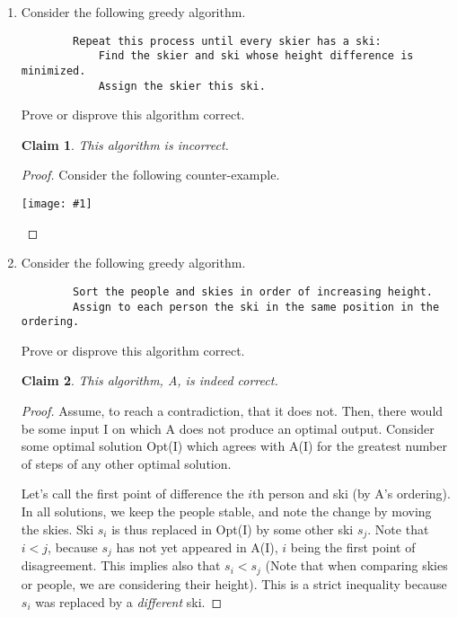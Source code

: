 \documentclass{article}
\newtheorem{thm}{Claim}
\providecommand{\image}[1]{
    \begin{center}
        \texttt{[image: \#1]}
    \end{center}
}
\begin{document}
    \begin{enumerate}[label=(\alph*)]
        \item Consider the following greedy algorithm.
        \begin{lstlisting}
        Repeat this process until every skier has a ski:
            Find the skier and ski whose height difference is minimized.
            Assign the skier this ski.
        \end{lstlisting}
        Prove or disprove this algorithm correct.

        \begin{thm}
            This algorithm is incorrect.
        \end{thm}
        \begin{proof}
            Consider the following counter-example.
            \image{p9table}
        \end{proof}

        \pagebreak %
        \item Consider the following greedy algorithm.
        \begin{lstlisting}
        Sort the people and skies in order of increasing height.
        Assign to each person the ski in the same position in the ordering.
        \end{lstlisting}
        Prove or disprove this algorithm correct.

        \begin{thm}
            This algorithm, A, is indeed correct.
        \end{thm}
        \begin{proof}
            Assume, to reach a contradiction, that it does not.
            Then, there would be some input I on which A does not produce an optimal output.
            Consider some optimal solution Opt(I) which agrees with A(I) for the greatest number of steps of any other optimal solution.

            Let's call the first point of difference the $i$th person and ski (by A's ordering).
            In all solutions, we keep the people stable, and note the change by moving the skies.
            Ski $s_i$ is thus replaced in Opt(I) by some other ski $s_j$.
            Note that $i < j$, because $s_j$ has not yet appeared in A(I), $i$ being the first point of disagreement.
            This implies also that $s_i < s_j$ (Note that when comparing skies or people, we are considering their height).
            This is a strict inequality because $s_i$ was replaced by a \emph{different} ski.


\end{proof}
\end{enumerate}
\end{document}
